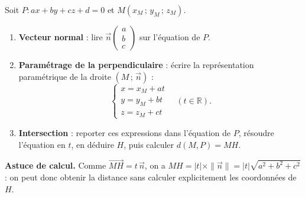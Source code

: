 \documentclass[11pt]{article}
\begin{document}
\begin{methode}
Soit $P : ax + by + cz + d = 0$ et $M(x_M\,;\,y_M\,;\,z_M)$.
\begin{enumerate}
\item \textbf{Vecteur normal} : lire $\vec{n}\begin{pmatrix} a \\ b \\ c \end{pmatrix}$ sur l'équation de $P$.
\item \textbf{Paramétrage de la perpendiculaire} : écrire la représentation paramétrique de la droite $(M\,;\,\vec{n})$ :
\[ \begin{cases} x = x_M + at \\ y = y_M + bt \\ z = z_M + ct \end{cases} \quad (t \in \mathbb{R}). \]
\item \textbf{Intersection} : reporter ces expressions dans l'équation de $P$, résoudre l'équation en $t$, en déduire $H$, puis calculer $d(M, P) = MH$.
\end{enumerate}
\textbf{Astuce de calcul.} Comme $\overrightarrow{MH} = t\,\vec{n}$, on a $MH = |t| \times \|\vec{n}\| = |t|\sqrt{a^2+b^2+c^2}$ : on peut donc obtenir la distance sans calculer explicitement les coordonnées de $H$.
\end{methode}
\end{document}
